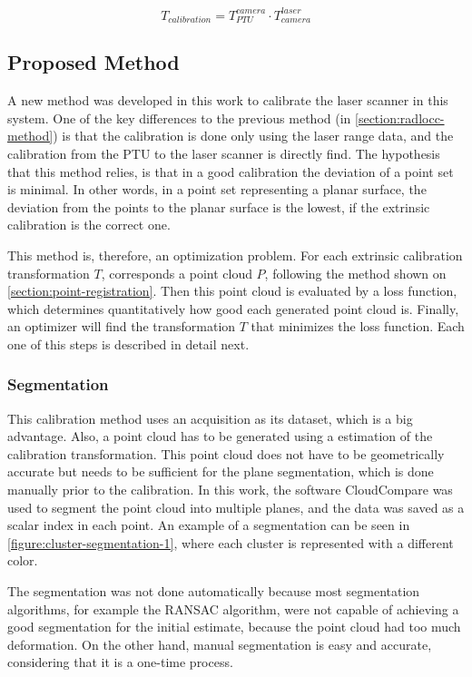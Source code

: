\begin{equation}
    \label{eqn:radlocc-full-calibration}
    T_{calibration} = T_{PTU}^{camera} \cdot T_{camera}^{laser}
\end{equation}

\subsection{Proposed Method}
\label{section:proposed-method}

A new method was developed in this work to calibrate the laser scanner in this system. One of the key differences to the previous method (in \cref{section:radlocc-method}) is that the calibration is done only using the laser range data, and the calibration from the PTU to the laser scanner is directly find. The hypothesis that this method relies, is that in a good calibration the deviation of a point set is minimal. In other words, in a point set representing a planar surface, the deviation from the points to the planar surface is the lowest, if the extrinsic calibration is the correct one.

This method is, therefore, an optimization problem. For each extrinsic calibration transformation $T$, corresponds a point cloud $P$, following the method shown on \cref{section:point-registration}. Then this point cloud is evaluated by a loss function, which determines quantitatively how good each generated point cloud is. Finally, an optimizer will find the transformation $T$ that minimizes the loss function. Each one of this steps is described in detail next.

\subsubsection{Segmentation}

This calibration method uses an acquisition as its dataset, which is a big advantage. Also, a point cloud has to be generated using a estimation of the calibration transformation. This point cloud does not have to be geometrically accurate but needs to be sufficient for the plane segmentation, which is done manually prior to the calibration. In this work, the software CloudCompare was used to segment the point cloud into multiple planes, and the data was saved as a scalar index in each point. An example of a segmentation can be seen in \cref{figure:cluster-segmentation-1}, where each cluster is represented with a different color.

The segmentation was not done automatically because most segmentation algorithms, for example the RANSAC algorithm, were not capable of achieving a good segmentation for the initial estimate, because the point cloud had too much deformation. On the other hand, manual segmentation is easy and accurate, considering that it is a one-time process.

